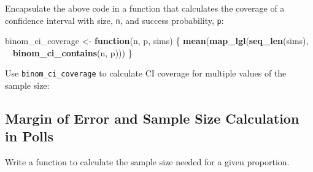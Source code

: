 \documentclass[]{book}
\newenvironment{Shaded}{\begin{snugshade}}{\end{snugshade}}
\newcommand{\KeywordTok}[1]{\textcolor[rgb]{0.13,0.29,0.53}{\textbf{#1}}}
\newcommand{\DataTypeTok}[1]{\textcolor[rgb]{0.13,0.29,0.53}{#1}}
\newcommand{\StringTok}[1]{\textcolor[rgb]{0.31,0.60,0.02}{#1}}
\newcommand{\CommentTok}[1]{\textcolor[rgb]{0.56,0.35,0.01}{\textit{#1}}}
\newcommand{\ControlFlowTok}[1]{\textcolor[rgb]{0.13,0.29,0.53}{\textbf{#1}}}
\newcommand{\OperatorTok}[1]{\textcolor[rgb]{0.81,0.36,0.00}{\textbf{#1}}}
\newcommand{\NormalTok}[1]{#1}
\theoremstyle{definition}
\theoremstyle{definition}
\theoremstyle{definition}
\theoremstyle{remark}
\begin{document}
Encapsulate the above code in a function that calculates the coverage of
a confidence interval with size, \texttt{n}, and success probability,
\texttt{p}:

\begin{Shaded}
\begin{Highlighting}[]
\NormalTok{binom_ci_coverage <-}\StringTok{ }\ControlFlowTok{function}\NormalTok{(n, p, sims) \{}
  \KeywordTok{mean}\NormalTok{(}\KeywordTok{map_lgl}\NormalTok{(}\KeywordTok{seq_len}\NormalTok{(sims), }\OperatorTok{~}\StringTok{ }\KeywordTok{binom_ci_contains}\NormalTok{(n, p)))}
\NormalTok{\}}
\end{Highlighting}
\end{Shaded}

Use \texttt{binom\_ci\_coverage} to calculate CI coverage for multiple
values of the sample size:

\begin{Shaded}
\end{Shaded}

\subsection{Margin of Error and Sample Size Calculation in
Polls}\label{margin-of-error-and-sample-size-calculation-in-polls}

Write a function to calculate the sample size needed for a given
proportion.
\end{document}

